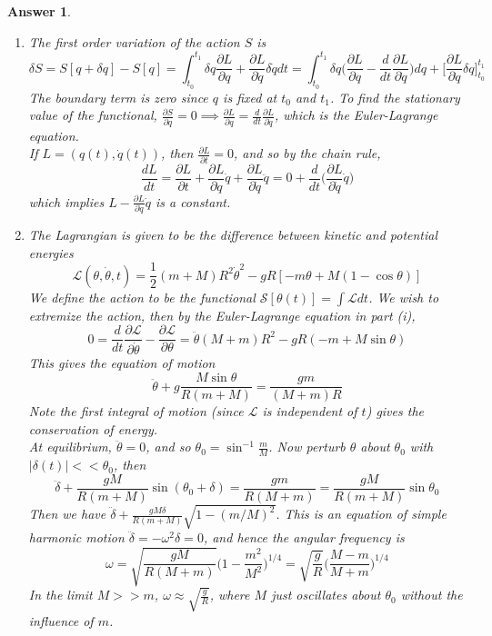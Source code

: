 \documentclass[a4paper]{article}
\newtheorem{ans}{Answer}[section]
\theoremstyle{new}
\begin{document}
\begin{ans}\leavevmode
\begin{enumerate}[label=(\roman*)]
\item The first order variation of the action $S$ is
$$\delta S=S[q+\delta q]-S[q]=\int_{t_0}^{t_1}\delta q\frac{\partial L}{\partial q}+\frac{\partial L}{\partial\dot{q}}\delta\dot{q}dt=\int_{t_0}^{t_1}\delta q\bigg(\frac{\partial L}{\partial q}-\frac{d}{dt}\frac{\partial L}{\partial\dot{q}}\bigg)dq+\bigg[\frac{\partial L}{\partial\dot{q}}\delta q\bigg]_{t_0}^{t_1}$$
The boundary term is zero since $q$ is fixed at $t_0$ and $t_1$. To find the stationary value of the functional, $\frac{\partial S}{\partial q}=0\implies\frac{\partial L}{\partial q}=\frac{d}{dt}\frac{\partial L}{\partial\dot{q}}$, which is the Euler-Lagrange equation.\\[5pt]
If $L=(q(t),\dot{q}(t))$, then $\frac{\partial L}{\partial t}=0$, and so by the chain rule,
$$\frac{dL}{dt}=\frac{\partial L}{\partial t}+\frac{\partial L}{\partial q}\dot{q}+\frac{\partial L}{\partial \dot{q}}\ddot{q}=0+\frac{d}{dt}\bigg(\frac{\partial L}{\partial\dot{q}}\dot{q}\bigg)$$
which implies $L-\frac{\partial L}{\partial\dot{q}}\dot{q}$ is a constant.
\item The Lagrangian is given to be the difference between kinetic and potential energies
$$\mathcal{L}(\theta,\dot{\theta},t)=\frac{1}{2}(m+M)R^2\dot{\theta}^2-gR[-m\theta+M(1-\cos\theta)]$$
We define the action to be the functional $\mathcal{S}[\theta(t)]=\int\mathcal{L}dt$. We wish to extremize the action, then by the Euler-Lagrange equation in part (i),
$$0=\frac{d}{dt}\frac{\partial\mathcal{L}}{\partial\dot{\theta}}-\frac{\partial\mathcal{L}}{\partial\theta}=\ddot{\theta}(M+m)R^2-gR(-m+M\sin\theta)$$
This gives the equation of motion $$\ddot{\theta}+g\frac{M\sin\theta}{R(m+M)}=\frac{gm}{(M+m)R}$$
Note the first integral of motion (since $\mathcal{L}$ is independent of $t$) gives the conservation of energy.\\[5pt]
At equilibrium, $\ddot{\theta}=0$, and so $\theta_0=\sin^{-1}\frac{m}{M}$. Now perturb $\theta$ about $\theta_0$ with $|\delta(t)|<<\theta_0$, then
$$\ddot{\delta}+\frac{gM}{R(m+M)}\sin(\theta_0+\delta)=\frac{gm}{R(M+m)}=\frac{gM}{R(m+M)}\sin\theta_0$$
Then we have $\ddot{\delta}+\frac{gM\delta}{R(m+M)}\sqrt{1-(m/M)^2}$. This is an equation of simple harmonic motion $\ddot{\delta}=-\omega^2\delta=0$, and hence the angular frequency is 
$$\omega=\sqrt{\frac{gM}{R(M+m)}}\bigg(1-\frac{m^2}{M^2}\bigg)^{1/4}=\sqrt{\frac{g}{R}}\bigg(\frac{M-m}{M+m}\bigg)^{1/4}$$
In the limit $M>>m$, $\omega\approx\sqrt{\frac{g}{R}}$, where $M$ just oscillates about $\theta_0$ without the influence of $m$.
\end{enumerate}
\end{ans}
\end{document}
